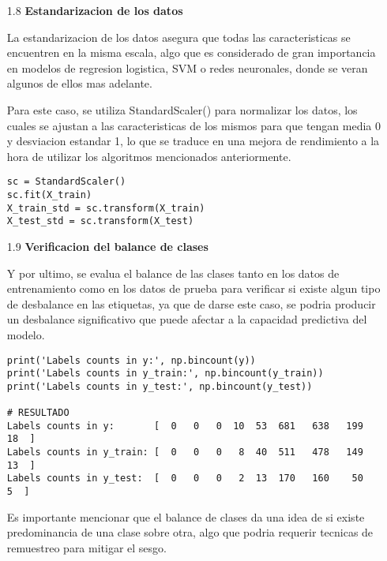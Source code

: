 \documentclass{article}
\begin{document}
\bigskip

\begin{itemize}

\item[1.8]  {\bf Estandarizacion de los datos}

La estandarizacion de los datos asegura que todas las caracteristicas se encuentren en la misma escala, algo que es considerado de gran importancia en modelos de regresion logistica, SVM o redes neuronales, donde se veran algunos de ellos mas adelante.

Para este caso, se utiliza StandardScaler() para normalizar los datos, los cuales se ajustan a las caracteristicas de los mismos para que tengan media 0 y desviacion estandar 1, lo que se traduce en una mejora de rendimiento a la hora de utilizar los algoritmos mencionados anteriormente.

\begin{tcolorbox}[width=14cm]
\begin{scriptsize}
\begin{verbatim}
sc = StandardScaler()
sc.fit(X_train)
X_train_std = sc.transform(X_train)
X_test_std = sc.transform(X_test)
\end{verbatim}
\end{scriptsize}
\end{tcolorbox}

\end{itemize}

\bigskip

\begin{itemize}

\item[1.9]  {\bf Verificacion del balance de clases}

Y por ultimo, se evalua el balance de las clases tanto en los datos de entrenamiento como en los datos de prueba para verificar si existe algun tipo de desbalance en las etiquetas, ya que de darse este caso, se podria producir un desbalance significativo que puede afectar a la capacidad predictiva del modelo.

\begin{tcolorbox}[width=14cm]
\begin{scriptsize}
\begin{verbatim}
print('Labels counts in y:', np.bincount(y))
print('Labels counts in y_train:', np.bincount(y_train))
print('Labels counts in y_test:', np.bincount(y_test))

# RESULTADO
Labels counts in y:       [  0   0   0  10  53  681   638   199   18  ]
Labels counts in y_train: [  0   0   0   8  40  511   478   149   13  ]
Labels counts in y_test:  [  0   0   0   2  13  170   160    50    5  ]
\end{verbatim}
\end{scriptsize}
\end{tcolorbox}

Es importante mencionar que el balance de clases da una idea de si existe predominancia de una clase sobre otra, algo que podria requerir tecnicas de remuestreo para mitigar el sesgo.

\end{itemize}
\end{document}
